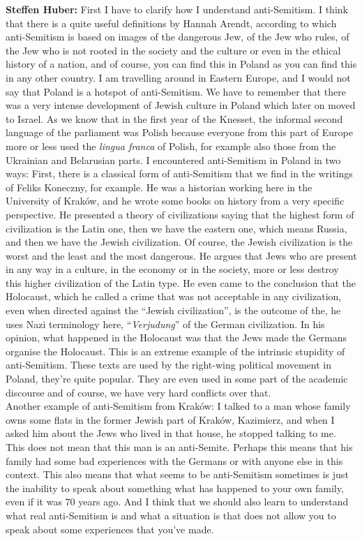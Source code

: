 \textbf{Steffen Huber:} First I have to clarify how I understand anti-Semitism. I think that there is a quite useful definitions by Hannah Arendt, according to which anti-Semitism is based on images of the dangerous Jew, of the Jew who rules, of the Jew who is not rooted in the society and the culture or even in the ethical history of a nation, and of course, you can find this in Poland as you can find this in any other country. I am travelling around in Eastern Europe, and I would not say that Poland is a hotspot of anti-Semitism. We have to remember that there was a very intense development of Jewish culture in Poland which later on moved to Israel. As we know that in the first year of the Knesset, the informal second language of the parliament was Polish because everyone from this part of Europe more or less used the \textit{lingua franca} of Polish, for example also those from the Ukrainian and Belarusian parts. I encountered anti-Semitism in Poland in two ways: First, there is a classical form of anti-Semitism that we find in the writings of Feliks Koneczny, for example. He was a historian working here in the University of Kraków, and he wrote some books on history from a very specific perspective. He presented a theory of civilizations saying that the highest form of civilization is the Latin one, then we have the eastern one, which means Russia, and then we have the Jewish civilization. Of course, the Jewish civilization is the worst and the least and the most dangerous. He argues that Jews who are present in any way in a culture, in the economy or in the society, more or less destroy this higher civilization of the Latin type. He even came to the conclusion that the Holocaust, which he called a crime that was not acceptable in any civilization, even when directed against the ``Jewish civilization'', is the outcome of the, he uses Nazi terminology here, ``\textit{Verjudung}'' of the German civilization. In his opinion, what happened in the Holocaust was that the Jews made the Germans organise the Holocaust. This is an extreme example of the intrinsic stupidity of anti-Semitism. These texts are used by the right-wing political movement in Poland, they're quite popular. They are even used in some part of the academic discourse and of course, we have very hard conflicts over that.\\
Another example of anti-Semitism from Kraków: I talked to a man whose family owns some flats in the former Jewish part of Kraków, Kazimierz, and when I asked him about the Jews who lived in that house, he stopped talking to me. This does not mean that this man is an anti-Semite. Perhaps this means that his family had some bad experiences with the Germans or with anyone else in this context. This also means that what seems to be anti-Semitism sometimes is just the inability to speak about something what has happened to your own family, even if it was 70 years ago. And I think that we should also learn to understand what real anti-Semitism is and what a situation is that does not allow you to speak about some experiences that you’ve made. 

